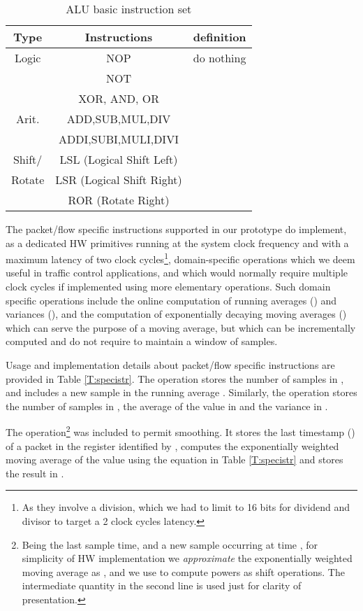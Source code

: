 \documentclass{sig-alternate}
\begin{document}
\begin{table}[t]
\vspace{-.6em}
\centering
\small
\begin{tabular}{|c|c|c|}
  \hline
  Type & Instructions & definition \\
\hline
Logic & NOP & do nothing\\
   & NOT & \\
 & XOR, AND, OR & \\
\hline
Arit. & ADD,SUB,MUL,DIV     & \\
    & ADDI,SUBI,MULI,DIVI & \\
\hline
Shift/ & LSL (Logical Shift Left) &  \\ 
Rotate  & LSR (Logical Shift Right) & \\
						 & ROR (Rotate Right)  &  \\
\hline
\end{tabular}
      	  \vspace{-1em}
\caption{ALU basic instruction set}
      	  \vspace{-1em}

\label{T:ALU}
\end{table}

The packet/flow specific instructions supported in our prototype do implement, as a dedicated HW primitives running at the system clock frequency and with a maximum latency of two clock cycles\footnote{As they involve a division, which we had to limit to 16 bits for dividend and divisor to target a 2 clock cycles latency.}, domain-specific operations which we deem useful in traffic control applications, and which would normally require multiple clock cycles if implemented using more elementary operations. Such domain specific operations include the online computation of running averages () and variances (), and the computation of exponentially decaying moving averages () which can serve the purpose of a moving average, but which can be incrementally computed and do not require to maintain a window of samples. 

Usage and implementation details about packet/flow specific instructions are provided in Table \ref{T:specistr}. The  operation stores the number of samples in , and includes a new sample  in  the running average . Similarly, the  operation stores the number of samples in , the average of the value  in  and the variance in .

The  operation\footnote{Being  the last sample time, and  a new sample occurring at time , for simplicity of HW implementation we {\em approximate} the exponentially weighted moving average as , and we use  to compute powers as shift operations. The intermediate  quantity in the second line is used just for clarity of presentation.}
was included to permit smoothing. It stores the last timestamp () of a packet in the register identified by , computes the exponentially weighted moving average of the value  using the equation in Table \ref{T:specistr} and stores the result in .
\end{document}
